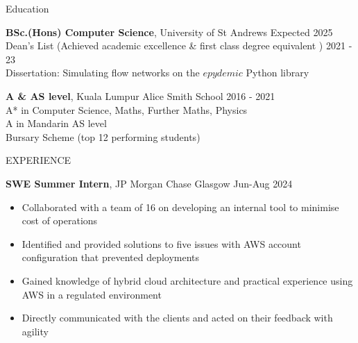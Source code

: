 \documentclass{resume} %
\begin{document}

\begin{rSection}{Education}

{\bf BSc.(Hons) Computer Science}, University of St Andrews \hfill {Expected 2025}\\
Dean's List (Achieved academic excellence \& first class degree equivalent ) \hfill {2021 - 23}\\
Dissertation: Simulating flow networks on the $epydemic$ Python library

{\bf A \& AS level}, Kuala Lumpur Alice Smith School \hfill {2016 - 2021}\\
A* in Computer Science, Maths, Further Maths, Physics\\
A in Mandarin AS level\\
Bursary Scheme (top 12 performing students)

\end{rSection}


\begin{rSection}{EXPERIENCE}

\textbf{SWE Summer Intern}, JP Morgan Chase Glasgow \hfill Jun-Aug 2024
\vspace*{-5pt}
\begin{itemize}
    \itemsep -5pt {} 
     \item Collaborated with a team of 16 on developing an internal tool to minimise cost of operations
     \item Identified and provided solutions to five issues with AWS account configuration that prevented deployments
    \item Gained knowledge of hybrid cloud architecture and practical experience using AWS in a regulated environment
    \item Directly communicated with the clients and acted on their feedback with agility
\end{itemize}
 
\end{rSection} 

\end{document}
